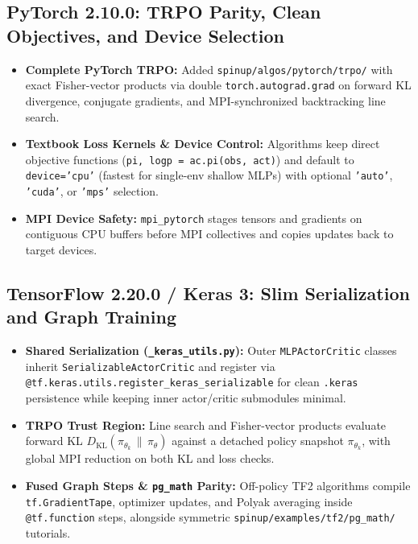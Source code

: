 \documentclass{article}
\begin{document}
\subsection{PyTorch 2.10.0: TRPO Parity, Clean Objectives, and Device Selection}
\begin{itemize}
    \item \textbf{Complete PyTorch TRPO:} Added \texttt{spinup/algos/pytorch/trpo/} with exact Fisher-vector products via double \texttt{torch.autograd.grad} on forward KL divergence, conjugate gradients, and MPI-synchronized backtracking line search.
    \item \textbf{Textbook Loss Kernels \& Device Control:} Algorithms keep direct objective functions (\texttt{pi, logp = ac.pi(obs, act)}) and default to \texttt{device='cpu'} (fastest for single-env shallow MLPs) with optional \texttt{'auto'}, \texttt{'cuda'}, or \texttt{'mps'} selection.
    \item \textbf{MPI Device Safety:} \texttt{mpi\_pytorch} stages tensors and gradients on contiguous CPU buffers before MPI collectives and copies updates back to target devices.
\end{itemize}

\subsection{TensorFlow 2.20.0 / Keras 3: Slim Serialization and Graph Training}
\begin{itemize}
    \item \textbf{Shared Serialization (\texttt{\_keras\_utils.py}):} Outer \texttt{MLPActorCritic} classes inherit \texttt{SerializableActorCritic} and register via \texttt{@tf.keras.utils.register\_keras\_serializable} for clean \texttt{.keras} persistence while keeping inner actor/critic submodules minimal.
    \item \textbf{TRPO Trust Region:} Line search and Fisher-vector products evaluate forward KL $D_{\mathrm{KL}}(\pi_{\theta_k} \,\|\, \pi_\theta)$ against a detached policy snapshot $\pi_{\theta_k}$, with global MPI reduction on both KL and loss checks.
    \item \textbf{Fused Graph Steps \& \texttt{pg\_math} Parity:} Off-policy TF2 algorithms compile \texttt{tf.GradientTape}, optimizer updates, and Polyak averaging inside \texttt{@tf.function} steps, alongside symmetric \texttt{spinup/examples/tf2/pg\_math/} tutorials.
\end{itemize}
\end{document}
